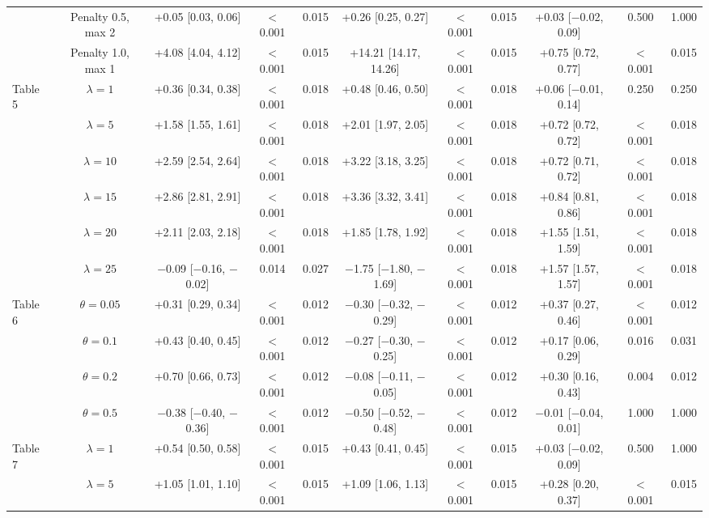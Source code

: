 \documentclass[10pt,letterpaper]{article}
\begin{document}
\begin{table}[!htb]
{\begin{tabular}{lcccccccccc}
 & Penalty 0.5, max 2 & +0.05 [0.03, 0.06] & $<$0.001 & 0.015 & +0.26 [0.25, 0.27] & $<$0.001 & 0.015 & +0.03 [$-$0.02, 0.09] & 0.500 & 1.000 \\
 & Penalty 1.0, max 1 & +4.08 [4.04, 4.12] & $<$0.001 & 0.015 & +14.21 [14.17, 14.26] & $<$0.001 & 0.015 & +0.75 [0.72, 0.77] & $<$0.001 & 0.015 \\
\midrule
Table 5 & $\lambda=1$ & +0.36 [0.34, 0.38] & $<$0.001 & 0.018 & +0.48 [0.46, 0.50] & $<$0.001 & 0.018 & +0.06 [$-$0.01, 0.14] & 0.250 & 0.250 \\
 & $\lambda=5$ & +1.58 [1.55, 1.61] & $<$0.001 & 0.018 & +2.01 [1.97, 2.05] & $<$0.001 & 0.018 & +0.72 [0.72, 0.72] & $<$0.001 & 0.018 \\
 & $\lambda=10$ & +2.59 [2.54, 2.64] & $<$0.001 & 0.018 & +3.22 [3.18, 3.25] & $<$0.001 & 0.018 & +0.72 [0.71, 0.72] & $<$0.001 & 0.018 \\
 & $\lambda=15$ & +2.86 [2.81, 2.91] & $<$0.001 & 0.018 & +3.36 [3.32, 3.41] & $<$0.001 & 0.018 & +0.84 [0.81, 0.86] & $<$0.001 & 0.018 \\
 & $\lambda=20$ & +2.11 [2.03, 2.18] & $<$0.001 & 0.018 & +1.85 [1.78, 1.92] & $<$0.001 & 0.018 & +1.55 [1.51, 1.59] & $<$0.001 & 0.018 \\
 & $\lambda=25$ & $-$0.09 [$-$0.16, $-$0.02] & 0.014 & 0.027 & $-$1.75 [$-$1.80, $-$1.69] & $<$0.001 & 0.018 & +1.57 [1.57, 1.57] & $<$0.001 & 0.018 \\
\midrule
Table 6 & $\theta=0.05$ & +0.31 [0.29, 0.34] & $<$0.001 & 0.012 & $-$0.30 [$-$0.32, $-$0.29] & $<$0.001 & 0.012 & +0.37 [0.27, 0.46] & $<$0.001 & 0.012 \\
 & $\theta=0.1$ & +0.43 [0.40, 0.45] & $<$0.001 & 0.012 & $-$0.27 [$-$0.30, $-$0.25] & $<$0.001 & 0.012 & +0.17 [0.06, 0.29] & 0.016 & 0.031 \\
 & $\theta=0.2$ & +0.70 [0.66, 0.73] & $<$0.001 & 0.012 & $-$0.08 [$-$0.11, $-$0.05] & $<$0.001 & 0.012 & +0.30 [0.16, 0.43] & 0.004 & 0.012 \\
 & $\theta=0.5$ & $-$0.38 [$-$0.40, $-$0.36] & $<$0.001 & 0.012 & $-$0.50 [$-$0.52, $-$0.48] & $<$0.001 & 0.012 & $-$0.01 [$-$0.04, 0.01] & 1.000 & 1.000 \\
\midrule
Table 7 & $\lambda=1$ & +0.54 [0.50, 0.58] & $<$0.001 & 0.015 & +0.43 [0.41, 0.45] & $<$0.001 & 0.015 & +0.03 [$-$0.02, 0.09] & 0.500 & 1.000 \\
 & $\lambda=5$ & +1.05 [1.01, 1.10] & $<$0.001 & 0.015 & +1.09 [1.06, 1.13] & $<$0.001 & 0.015 & +0.28 [0.20, 0.37] & $<$0.001 & 0.015 \\

\end{tabular}}
\end{table}
\end{document}
